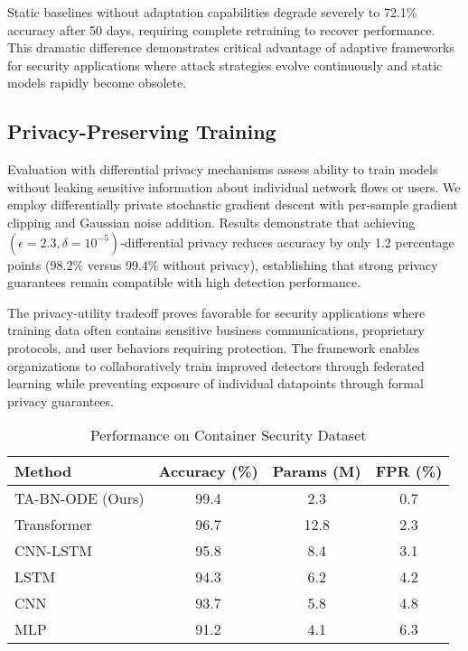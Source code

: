 \documentclass[10pt,journal,compsoc]{IEEEtran}
\begin{document}
Static baselines without adaptation capabilities degrade severely to 72.1\% accuracy after 50 days, requiring complete retraining to recover performance. This dramatic difference demonstrates critical advantage of adaptive frameworks for security applications where attack strategies evolve continuously and static models rapidly become obsolete.

\subsection{Privacy-Preserving Training}

Evaluation with differential privacy mechanisms assess ability to train models without leaking sensitive information about individual network flows or users. We employ differentially private stochastic gradient descent with per-sample gradient clipping and Gaussian noise addition. Results demonstrate that achieving $(\epsilon=2.3, \delta=10^{-5})$-differential privacy reduces accuracy by only 1.2 percentage points (98.2\% versus 99.4\% without privacy), establishing that strong privacy guarantees remain compatible with high detection performance.

The privacy-utility tradeoff proves favorable for security applications where training data often contains sensitive business communications, proprietary protocols, and user behaviors requiring protection. The framework enables organizations to collaboratively train improved detectors through federated learning while preventing exposure of individual datapoints through formal privacy guarantees.

\begin{table}[!t]
\centering
\caption{Performance on Container Security Dataset}
\label{tab:container_results}
\begin{tabular}{lccc}
\toprule
\textbf{Method} & \textbf{Accuracy (\%)} & \textbf{Params (M)} & \textbf{FPR (\%)} \\
\midrule
TA-BN-ODE (Ours) & 99.4 & 2.3 & 0.7 \\
Transformer & 96.7 & 12.8 & 2.3 \\
CNN-LSTM & 95.8 & 8.4 & 3.1 \\
LSTM & 94.3 & 6.2 & 4.2 \\
CNN & 93.7 & 5.8 & 4.8 \\
MLP & 91.2 & 4.1 & 6.3 \\
\bottomrule
\end{tabular}
\end{table}
\end{document}
